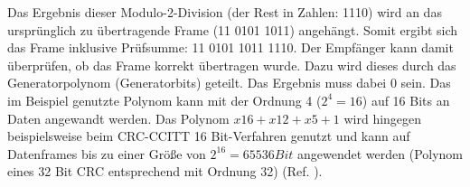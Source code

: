 Das Ergebnis dieser Modulo-2-Division (der Rest in Zahlen: 1110) wird an das
urspr{\"u}nglich zu {\"u}bertragende Frame (11 0101 1011) angeh{\"a}ngt. Somit ergibt sich
das Frame inklusive Pr{\"u}fsumme: 11 0101 1011 1110. Der
Empf{\"a}nger kann damit {\"u}berpr{\"u}fen, ob das Frame korrekt {\"u}bertragen
wurde. Dazu wird dieses durch das Generatorpolynom (Generatorbits) geteilt.
Das Ergebnis muss dabei 0 sein. Das im Beispiel genutzte Polynom kann mit der Ordnung 4
($2^4=16$) auf 16 Bits an Daten angewandt werden. Das Polynom $x16+x12+x5+1$
wird hingegen beispielsweise beim CRC-CCITT 16 Bit-Verfahren genutzt und
kann auf Datenframes bis zu einer Gr{\"o}{\ss}e von $2^{16}=65536 Bit$
angewendet werden (Polynom eines 32 Bit CRC entsprechend mit Ordnung 32) (Ref.
\cite{web2}).

